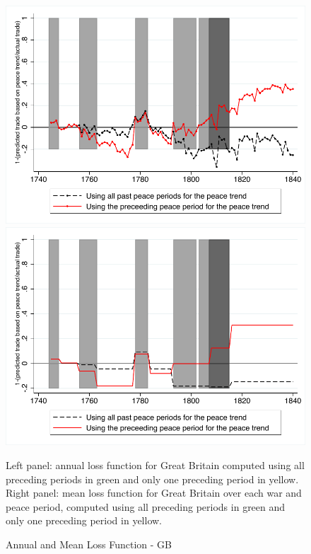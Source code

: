 \documentclass[12pt,a4paper,notitlepage,english]{article}
\newcommand{\fontsmall}{\fontsize{10pt}{12pt}\selectfont}
\begin{document}
\begin{appendix}
\begin{figure}[h!]
\caption{Annual and Mean Loss Function - GB}
\label{fig:GBmean_annual_loss}
\centering
\includegraphics[scale=0.6]{GBannual_loss_function}
\includegraphics[scale=0.6]{GBmean_loss_function}
\begin{minipage}{18cm}
\begin{flushleft}
\fontsmall
Left panel: annual loss function for Great Britain computed using all preceding periods in green and only one preceding period in yellow. 
Right panel: mean loss function for Great Britain over each war and peace period, computed using all preceding periods in green and only one preceding period in yellow. 
\end{flushleft}
\end{minipage}
\end{figure}


\end{appendix}
\end{document}
